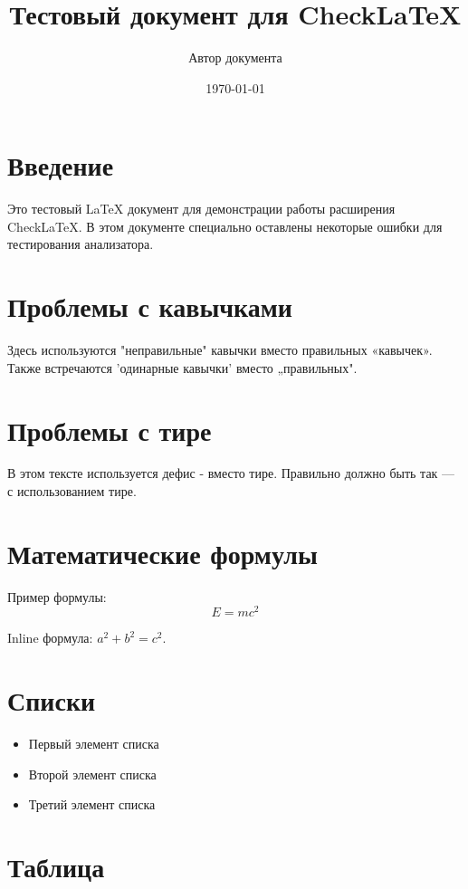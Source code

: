 \documentclass[12pt,a4paper]{article}
\title{Тестовый документ для CheckLaTeX}
\author{Автор документа}
\date{\today}
\begin{document}
\maketitle

\section{Введение}

Это тестовый LaTeX документ для демонстрации работы расширения CheckLaTeX. 
В этом документе специально оставлены некоторые ошибки для тестирования анализатора.

\section{Проблемы с кавычками}

Здесь используются "неправильные" кавычки вместо правильных «кавычек».
Также встречаются 'одинарные кавычки' вместо „правильных".

\section{Проблемы с тире}

В этом тексте используется дефис - вместо тире.
Правильно должно быть так — с использованием тире.

\section{Математические формулы}

Пример формулы:
\begin{equation}
    E = mc^2
\end{equation}

Inline формула: $a^2 + b^2 = c^2$.

\section{Списки}

\begin{itemize}
    \item Первый элемент списка
    \item Второй элемент списка
    \item Третий элемент списка
\end{itemize}

\section{Таблица}
\end{document}

